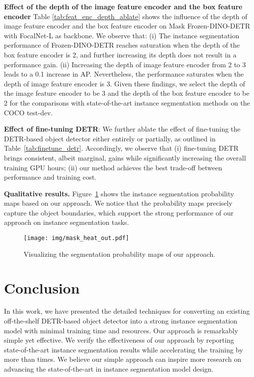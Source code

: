 \documentclass[10pt,twocolumn,letterpaper]{article}
\begin{document}
\vspace{1mm}
\noindent\textbf{Effect of the depth of the image feature encoder and the box feature encoder}
Table \ref{tab:feat_enc_depth_ablate} shows the influence of the depth of image feature encoder and the box feature encoder on Mask Frozen-DINO-DETR with FocalNet-L as backbone. We observe that: (i) The instance segmentation performance of Frozen-DINO-DETR reaches saturation when the depth of the box feature encoder is 2, and further increasing its depth does not result in a performance gain. (ii) Increasing the depth of image feature encoder from 2 to 3 leads to a 0.1 increase in AP. Nevertheless, the performance saturates when the depth of image feature encoder is 3. Given these findings, we select the depth of the image feature encoder to be 3 and the depth of the box feature encoder to be 2 for the comparisons with state-of-the-art instance segmentation methods on the COCO test-dev.

\vspace{1mm}
\noindent\textbf{Effect of fine-tuning DETR}:
We further ablate the effect of fine-tuning the DETR-based object detector either entirely or partially, as outlined in Table~\ref{tab:finetune_detr}.
Accordingly,
we observe that (i) fine-tuning DETR brings consistent, albeit marginal, gains while significantly increasing the overall training GPU hours; (ii) our method achieves the best trade-off between performance and training cost.

\vspace{1mm}
\noindent\textbf{Qualitative results.}
Figure~\ref{fig:box2q_attn} shows the instance segmentation probability maps based on our approach. We notice that the probability maps precisely capture the object boundaries, which support the strong performance of our approach on instance segmentation tasks.


\begin{figure}[t]
\centering
\texttt{[image: img/mask\_heat\_out.pdf]}
\caption{\small{Visualizing the segmentation probability maps of our approach.}}
\label{fig:box2q_attn}
\vspace{-3mm}
\end{figure}

\section{Conclusion}
In this work, we have presented the detailed techniques for converting an existing off-the-shelf DETR-based object detector into a strong instance segmentation model with minimal training time and resources. Our approach is remarkably simple yet effective. 
We verify the effectiveness of our approach by reporting state-of-the-art instance segmentation results while accelerating the training by more than  times.
We believe our simple approach can inspire more research on advancing the state-of-the-art in instance segmentation model design.


{\small


}
\end{document}
